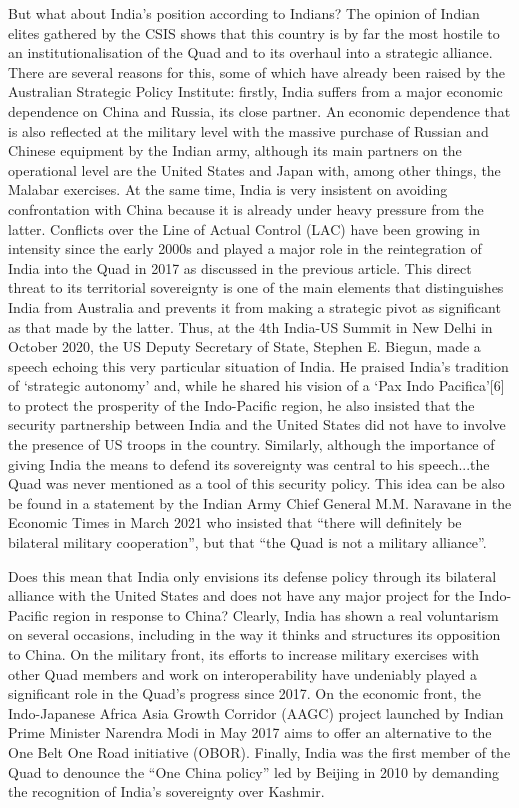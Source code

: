 \documentclass[11pt,a4paper]{article}
\begin{document}
But what about India’s position according to Indians? The opinion of Indian elites gathered by the CSIS shows that this country is by far the most hostile to an institutionalisation of the Quad and to its overhaul into a strategic alliance. There are several reasons for this, some of which have already been raised by the Australian Strategic Policy Institute: firstly, India suffers from a major economic dependence on China and Russia, its close partner. An economic dependence that is also reflected at the military level with the massive purchase of Russian and Chinese equipment by the Indian army, although its main partners on the operational level are the United States and Japan with, among other things, the Malabar exercises. At the same time, India is very insistent on avoiding confrontation with China because it is already under heavy pressure from the latter. Conflicts over the Line of Actual Control (LAC) have been growing in intensity since the early 2000s and played a major role in the reintegration of India into the Quad in 2017 as discussed in the previous article. This direct threat to its territorial sovereignty is one of the main elements that distinguishes India from Australia and prevents it from making a strategic pivot as significant as that made by the latter. Thus, at the 4th India-US Summit in New Delhi in October 2020, the US Deputy Secretary of State, Stephen E. Biegun, made a speech echoing this very particular situation of India. He praised India’s tradition of ‘strategic autonomy’ and, while he shared his vision of a ‘Pax Indo Pacifica’{[}6{]} to protect the prosperity of the Indo-Pacific region, he also insisted that the security partnership between India and the United States did not have to involve the presence of US troops in the country. Similarly, although the importance of giving India the means to defend its sovereignty was central to his speech...the Quad was never mentioned as a tool of this security policy. This idea can be also be found in a statement by the Indian Army Chief General M.M. Naravane in the Economic Times in March 2021 who insisted that “there will definitely be bilateral military cooperation”, but that “the Quad is not a military alliance”.

Does this mean that India only envisions its defense policy through its bilateral alliance with the United States and does not have any major project for the Indo-Pacific region in response to China? Clearly, India has shown a real voluntarism on several occasions, including in the way it thinks and structures its opposition to China. On the military front, its efforts to increase military exercises with other Quad members and work on interoperability have undeniably played a significant role in the Quad’s progress since 2017. On the economic front, the Indo-Japanese Africa Asia Growth Corridor (AAGC) project launched by Indian Prime Minister Narendra Modi in May 2017 aims to offer an alternative to the One Belt One Road initiative (OBOR). Finally, India was the first member of the Quad to denounce the “One China policy” led by Beijing in 2010 by demanding the recognition of India’s sovereignty over Kashmir.
\end{document}
